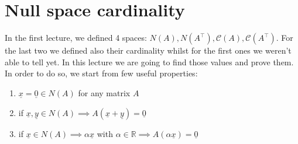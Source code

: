 \section{Null space cardinality}
In the first lecture, we defined 4 spaces: $N(A), N(A^\intercal), \mathcal{C}(A), \mathcal{C}(A^\intercal)$. For the last two we defined also their cardinality whilst for the first ones we weren't able to tell yet. In this lecture we are going to find those values and prove them. In order to do so, we start from few useful properties:
\begin{enumerate}
    \item $\underline{x} = \underline{0} \in N(A)$ for any matrix $A$
    \item if $\underline{x}, \underline{y} \in N(A) \implies A(\underline{x} + \underline{y}) = \underline{0}$
    \item if $\underline{x} \in N(A) \implies \alpha\underline{x}$ with $\alpha \in \mathbb{R} \implies A(\alpha\underline{x}) = \underline{0}$
\end{enumerate}  

